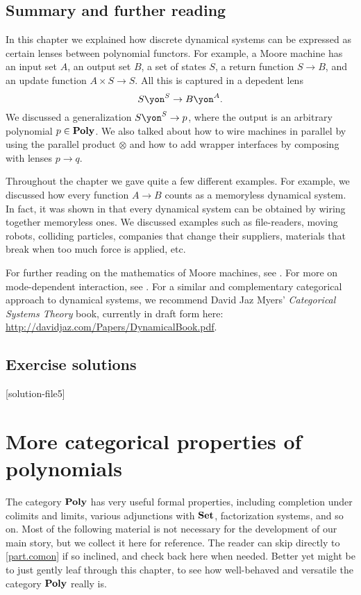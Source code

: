 \documentclass[Book-Poly]{subfiles}
\begin{document}
\section{Summary and further reading}

In this chapter we explained how discrete dynamical systems can be expressed as certain lenses between polynomial functors. For example, a Moore machine has an input set $A$, an output set $B$, a set of states $S$, a return function $S\to B$, and an update function $A\times S\to S$. All this is captured in a depedent lens
\[S\yon^S\to B\yon^A.\]
We discussed a generalization $S\yon^S\to p$, where the output is an arbitrary polynomial $p\in\mathbf{Poly}$. We also talked about how to wire machines in parallel by using the parallel product $\otimes$ and how to add wrapper interfaces by composing with lenses $p\to q$.

Throughout the chapter we gave quite a few different examples. For example, we discussed how every function $A\to B$ counts as a memoryless dynamical system. In fact, it was shown in \cite{beurier2019memoryless} that every dynamical system can be obtained by wiring together memoryless ones. We discussed examples such as file-readers, moving robots, colliding particles, companies that change their suppliers, materials that break when too much force is applied, etc.

For further reading on the mathematics of Moore machines, see \cite{conway2012regular}. For more on mode-dependent interaction, see \cite{spivak2017nesting}. For a similar and complementary categorical approach to dynamical systems, we recommend David Jaz Myers' \emph{Categorical Systems Theory} book, currently in draft form here: \url{http://davidjaz.com/Papers/DynamicalBook.pdf}.

\section{Exercise solutions}
{\footnotesize
}

[solution-file5]

\chapter{More categorical properties of polynomials} \label{ch.poly.bonus}

The category $\mathbf{Poly}$ has very useful formal properties, including completion under colimits and limits, various adjunctions with $\mathbf{Set}$, factorization systems, and so on. Most of the following material is not necessary for the development of our main story, but we collect it here for reference. The reader can skip directly to \cref{part.comon} if so inclined, and check back here when needed. Better yet might be to just gently leaf through this chapter, to see how well-behaved and versatile the category $\mathbf{Poly}$ really is.
\end{document}
